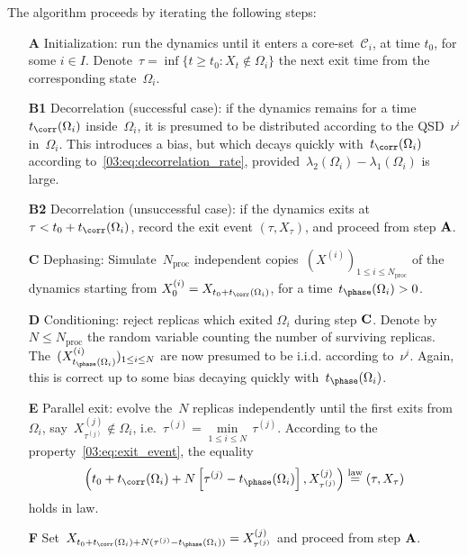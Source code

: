    \begin{algorithm}
        \label{03:alg:parrep}
        The algorithm proceeds by iterating the following steps:
        \begin{enumerate}[A.]
            \item[\bf{A}]{Initialization: run the dynamics until it enters a core-set~$\mathcal C_i$, at time $t_0$, for some $i\in I$. Denote~$\tau =\inf\{t\geq t_0: X_t\not\in\Omega_i\}$ the next exit time from the corresponding state~$\Omega_i$.}
            \item[\bf{B1}]{Decorrelation (successful case): if the dynamics remains for a time $t_{\corr}(\Omega_i)$ inside~$\Omega_i$, it is presumed to be distributed according to the QSD~$\nu^i$ in~$\Omega_i$. This introduces a bias, but which decays quickly with~$t_{\corr}(\Omega_i)$ according to~\eqref{03:eq:decorrelation_rate}, provided~$\lambda_2(\Omega_i)-\lambda_1(\Omega_i)$ is large.}
            \item[\bf{B2}]{Decorrelation (unsuccessful case): if the dynamics exits at $\tau < t_0 + t_{\corr}(\Omega_i)$, record the exit event $(\tau,X_\tau)$, and proceed from step $\text{\bf A}$.}
            \item[\bf{C}]{Dephasing: Simulate~$N_{\mathrm{proc}}$ independent copies~$\left(X^{(i)}\right)_{1\leq i\leq N_{\mathrm{proc}}}$ of the dynamics starting from $X_0^{(i)}=X_{t_0+t_{\corr}(\Omega_i)}$, for a time~$t_{\phase}(\Omega_i)>0$.}
            \item[\bf{D}]{Conditioning: reject replicas which exited $\Omega_i$ during step $\text{\bf C}$. Denote by~$N \leq N_{\mathrm{proc}}$ the random variable counting the number of surviving replicas.\\ The~$(X_{t_{\phase}(\Omega_i)}^{(i)})_{1\leq i\leq N}$ are now presumed to be i.i.d. according to~$\nu^i$. Again, this is correct up to some bias decaying quickly with~$t_{\phase}(\Omega_i)$.}
            \item[\bf{E}]{Parallel exit: evolve the~$N$ replicas independently until the first exits from~$\Omega_i$, say~$X_{\tau^{(j)}}^{(j)}\not\in\Omega_i$, i.e.~$\tau^{(j)} = \underset{1\leq i\leq N}{\min}\,\tau^{(j)}$. According to the property~\eqref{03:eq:exit_event}, the equality~$$\left(t_0+t_{\corr}(\Omega_i) + N\left[\tau^{(j)}-t_{\phase}(\Omega_i)\right],X^{(j)}_{\tau^{(j)}}\right)\overset{\mathrm{law}}{=}(\tau,X_{\tau})$$ holds in law.}
            \item[\bf{F}]{Set~$X_{t_0+t_{\corr}(\Omega_i) + N(\tau^{(j)}-t_{\phase}(\Omega_i))} = X_{\tau^{(j)}}^{(j)}$ and proceed from step {$\text{\bf A}$}.}
        \end{enumerate}
    \end{algorithm}
